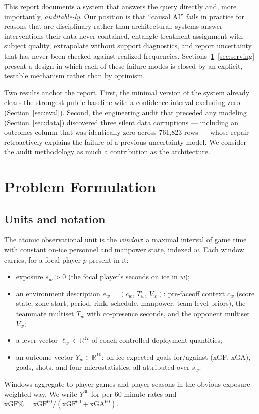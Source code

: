 \documentclass[11pt]{article}
\newcommand{\R}{\mathbb{R}}
\begin{document}
This report documents a system that answers the query directly and, more importantly,
\emph{auditable-ly}. Our position is that ``causal AI'' fails in practice for reasons that
are disciplinary rather than architectural: systems answer interventions their data never
contained, entangle treatment assignment with subject quality, extrapolate without support
diagnostics, and report uncertainty that has never been checked against realized frequencies.
Sections~\ref{sec:formulation}--\ref{sec:serving} present a design in which each of these
failure modes is closed by an explicit, testable mechanism rather than by optimism.

Two results anchor the report. First, the minimal version of the system already clears the
strongest public baseline with a confidence interval excluding zero
(Section~\ref{sec:eval}). Second, the engineering audit that preceded any modeling
(Section~\ref{sec:data}) discovered three silent data corruptions --- including an outcomes
column that was identically zero across 761{,}823 rows --- whose repair retroactively
explains the failure of a previous uncertainty model. We consider the audit methodology as
much a contribution as the architecture.

\section{Problem Formulation}\label{sec:formulation}

\subsection{Units and notation}

The atomic observational unit is the \emph{window}: a maximal interval of game time with
constant on-ice personnel and manpower state, indexed $w$. Each window carries, for a focal
player $p$ present in it:
\begin{itemize}[nosep]
\item exposure $s_w > 0$ (the focal player's seconds on ice in $w$);
\item an environment description $e_w = (c_w,\, T_w,\, V_w)$: pre-faceoff context $c_w$
(score state, zone start, period, rink, schedule, manpower, team-level priors), the teammate
multiset $T_w$ with co-presence seconds, and the opponent multiset $V_w$;
\item a lever vector $\ell_w \in \R^{17}$ of coach-controlled deployment quantities;
\item an outcome vector $Y_w \in \R^{10}$: on-ice expected goals for/against (xGF, xGA),
goals, shots, and four microstatistics, all attributed over $s_w$.
\end{itemize}
Windows aggregate to player-games and player-seasons in the obvious exposure-weighted way.
We write $Y^{60}$ for per-60-minute rates and
$\mathrm{xGF}\% = \mathrm{xGF}^{60} / (\mathrm{xGF}^{60} + \mathrm{xGA}^{60})$.
\end{document}
